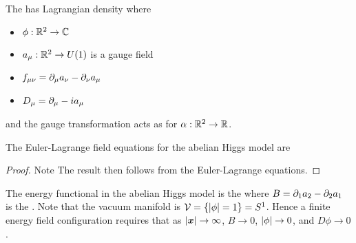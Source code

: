 \documentclass{article}
\begin{document}
\begin{definition}
The  has Lagrangian density 
where 
\begin{itemize}
    \item $\phi:\mathbb{R}^2 \to \mathbb{C}$
    \item $a_\mu : \mathbb{R}^2 \to U(1)$ is a gauge field
    \item $f_{\mu\nu} = \partial_\mu a_\nu - \partial_\nu a_\mu$
    \item $D_\mu = \partial_\mu - ia_\mu$
\end{itemize}
and the gauge transformation acts as
for $\alpha : \mathbb{R}^2 \to \mathbb{R}$. 
\end{definition}

\begin{prop}
The Euler-Lagrange field equations for the abelian Higgs model are 
\end{prop}
\begin{proof}
Note 
The result then follows from the Euler-Lagrange equations. 
\end{proof}

\begin{prop}
The energy functional in the abelian Higgs model is the 
where $B = \partial_1 a_2 - \partial_2 a_1$ is the . Note that the vacuum manifold is $\mathcal{V} = \left\{ \left\lvert \phi \right\rvert = 1 \right\} = S^1$. Hence a finite energy field configuration requires that as $\left\lvert \bm{x} \right\rvert\to\infty$, $B\to 0$, $\left\lvert \phi \right\rvert\to 0$, and $D\phi \to 0$. 
\end{prop}
\end{document}
